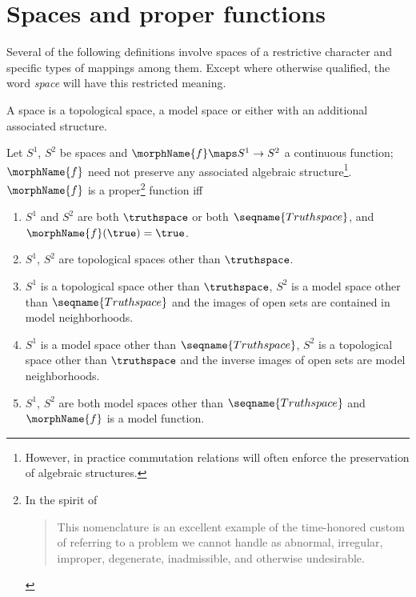 \documentclass{article}
\begin{document}
\section{Spaces and proper functions}
\label{sec:spaces}
Several of the following definitions involve spaces of a restrictive
character and specific types of mappings among them. Except where
otherwise qualified, the word \textit{space} will have this restricted
meaning.

\begin{definition}[Spaces]
\label{def:space}
A space is a topological space, a model space or either with an
additional associated structure.
\end{definition}

\begin{definition}
\label{def:proper}
Let $S^1$, $S^2$ be spaces and $\morphName{f} \maps S^1 \to S^2$ a
continuous function; $\morphName{f}$ need not preserve any associated
algebraic structure\footnote{
  However, in practice commutation relations will often enforce the
  preservation of algebraic structures.
}.
$\morphName{f}$ is a proper\footnote{
  In the spirit of \cite[footnote, p.~112] {GenTop}
  \begin{quote}
    This nomenclature is an excellent example of the time-honored
    custom of referring to a problem we cannot handle as abnormal,
    irregular, improper, degenerate, inadmissible, and otherwise
    undesirable.
  \end{quote}
}
function iff

\begin{enumerate}
\item $S^1$ and $S^2$ are both $\truthspace$ or both
$\seqname{Truthspace}$, and $\morphName{f}(\true)=\true$.

\item $S^1$, $S^2$ are topological spaces other than
$\truthspace$.

\item $S^1$ is a topological space other than
$\truthspace$, $S^2$ is a model space other than
$\seqname{Truthspace}$ and the images of open sets are contained in
model neighborhoods.

\item $S^1$ is a model space other than $\seqname{Truthspace}$, $S^2$ is
a topological space other than $\truthspace$ and the
inverse images of open sets are model neighborhoods.

\item $S^1$, $S^2$ are both model spaces other than
$\seqname{Truthspace}$ and $\morphName{f}$ is a model function.
\end{enumerate}
\end{definition}
\end{document}
